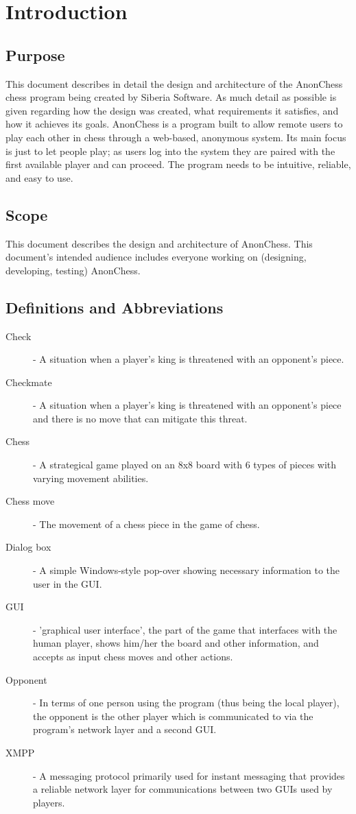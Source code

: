 \section{Introduction}

\subsection{Purpose}
This document describes in detail the design and architecture of the AnonChess chess program being created by Siberia Software. As much detail as possible is given regarding how the design was created, what requirements it satisfies, and how it achieves its goals.
AnonChess is a program built to allow remote users to play each other in chess through a web-based, anonymous system. Its main focus is just to let people play; as users log into the system they are paired with the first available player and can proceed. The program needs to be intuitive, reliable, and easy to use.

\subsection{Scope}
This document describes the design and architecture of AnonChess. This document's intended audience includes everyone working on (designing, developing, testing) AnonChess.
\subsection{Definitions and Abbreviations}
\begin{description}
\item[Check] - A situation when a player's king is threatened with an opponent's piece.
\item[Checkmate] - A situation when a player's king is threatened with an opponent's piece and there is no move that can mitigate this threat.
\item[Chess] - A strategical game played on an 8x8 board with 6 types of pieces with varying movement abilities.
\item[Chess move] - The movement of a chess piece in the game of chess.
\item[Dialog box] - A simple Windows-style pop-over showing necessary information to the user in the GUI.
\item[GUI] - 'graphical user interface', the part of the game that interfaces with the human player, shows him/her the board and other information, and accepts as input chess moves and other actions.
\item[Opponent] - In terms of one person using the program (thus being the local player), the opponent is the other player which is communicated to via the program's network layer and a second GUI.
\item[XMPP] - A messaging protocol primarily used for instant messaging that provides a reliable network layer for communications between two GUIs used by players.
\end{description}
